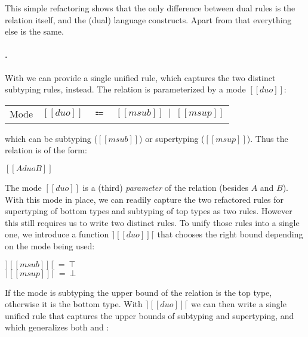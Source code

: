 
\noindent  This simple refactoring shows that the only difference between dual rules
is the relation itself, and the (dual) language constructs. Apart from that
everything else is the same.

\paragraph{\nameduo.}
With \nameduo we can provide a single unified rule,
which captures the two distinct subtyping rules, instead.
The \nameduo relation is parameterized by a mode
$[[duo]]$:

\begin{center}
\begin{tabular}{lrcl}
  Mode & $[[duo]]$  & $\Coloneqq$ & $[[msub]] \ \mid \ [[msup]]$
\end{tabular}
\end{center}

\noindent which can be subtyping ($[[msub]]$) or supertyping ($[[msup]]$).
Thus the \nameduo relation is of the form:

\begin{center}
	$[[A duo B]]$
\end{center}

\noindent The mode $[[duo]]$ is a (third) \emph{parameter} of the relation (besides
$A$ and $B$). With this mode in place, we can readily capture the
two refactored rules for supertyping of bottom types and subtyping of top types
as two \nameduo rules. However this still requires us to write two distinct rules.
To unify those rules into a single one, we introduce a function $\rceil [[duo]] \lceil$ that chooses
the right bound depending on the mode being used:

\begin{center}
      $\rceil\![[msub]]\!\lceil \ = \ \top$ \\
      $\rceil\![[msup]]\!\lceil \ = \ \bot$ \\
\end{center}

\noindent If the mode is subtyping the upper bound of the relation is the top type, otherwise it is
the bottom type. With $\rceil [[duo]] \lceil$ we can then write a single unified
rule that captures the upper bounds of subtyping and supertyping, and which generalizes both
 and :

